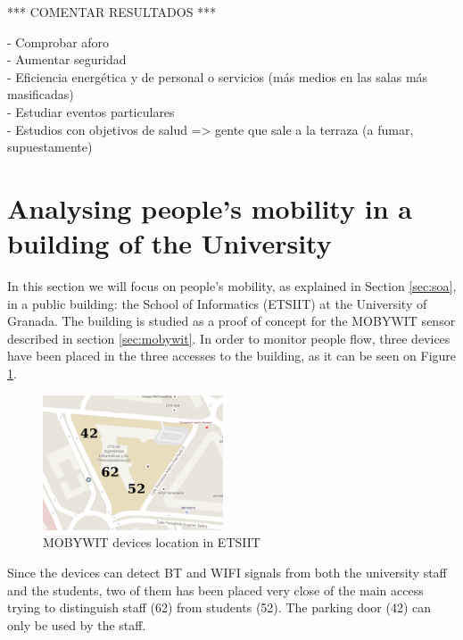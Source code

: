 \documentclass[preprint]{elsarticle}
\begin{document}
*** COMENTAR RESULTADOS ***

- Comprobar aforo\\
- Aumentar seguridad\\
- Eficiencia energética y de personal o servicios (más medios en las salas más masificadas)\\
- Estudiar eventos particulares\\
- Estudios con objetivos de salud => gente que sale a la terraza (a fumar, supuestamente)



\section{Analysing people's mobility in a building of the University}
\label{sec:etsiit}

In this section we will focus on people's mobility, as explained in Section \ref{sec:soa}, in a public building: the School of Informatics (ETSIIT) at the University of Granada. The building is studied as a proof of concept for the MOBYWIT sensor described in section \ref{sec:mobywit}. In order to monitor people flow, three devices have been placed in the three accesses to the building, as it can be seen on Figure \ref{fig:etsiit_map}.

\begin{figure}[!ht]
	\begin{center}
		\includegraphics[height=4cm]{imgs/etsiit_nodes.eps}
		\caption{MOBYWIT devices location in ETSIIT}
		\label{fig:etsiit_map}
	\end{center}
\end{figure}

Since the devices can detect BT and WIFI signals from both the university staff and the students, two of them has been placed very close of the main access trying to distinguish staff (62) from students (52). The parking door (42) can only be used by the staff.
\end{document}
